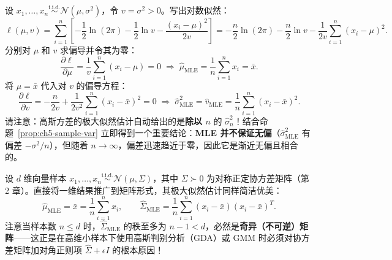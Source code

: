 \begin{example}
\label{ex:ch5-mle-1dgauss}
设 $x_1, \dots, x_n \stackrel{\text{i.i.d.}}{\sim} \mathcal{N}(\mu, \sigma^2)$，令 $v = \sigma^2 > 0$。写出对数似然：
\[
  \ell(\mu, v)
  = \sum_{i=1}^n \left[-\frac{1}{2}\ln(2\pi) - \frac{1}{2}\ln v - \frac{(x_i - \mu)^2}{2v}\right]
  = -\frac{n}{2}\ln(2\pi) - \frac{n}{2}\ln v - \frac{1}{2v}\sum_{i=1}^n (x_i - \mu)^2.
\]
分别对 $\mu$ 和 $v$ 求偏导并令其为零：
\[
  \frac{\partial \ell}{\partial \mu} = \frac{1}{v}\sum_{i=1}^n (x_i - \mu) = 0
  \;\Longrightarrow\;
  \hat{\mu}_{\text{MLE}} = \frac{1}{n}\sum_{i=1}^n x_i = \bar{x}.
\]
将 $\mu = \bar{x}$ 代入对 $v$ 的偏导方程：
\[
  \frac{\partial \ell}{\partial v} = -\frac{n}{2v} + \frac{1}{2v^2}\sum_{i=1}^n (x_i - \bar{x})^2 = 0
  \;\Longrightarrow\;
  \hat{\sigma}^2_{\text{MLE}} = \hat{v}_{\text{MLE}} = \frac{1}{n}\sum_{i=1}^n (x_i - \bar{x})^2.
\]
请注意：高斯方差的极大似然估计自动给出的是\textbf{除以 $n$} 的 $\hat{\sigma}_n^2$！结合命题~\ref{prop:ch5-sample-var} 立即得到一个重要结论：\textbf{MLE 并不保证无偏}（$\hat{\sigma}^2_{\text{MLE}}$ 有偏差 $-\sigma^2/n$），但随着 $n\to\infty$，偏差迅速趋近于零，因此它是渐近无偏且相合的。
\end{example}

\begin{example}
\label{ex:ch5-mle-mvg}
设 $d$ 维向量样本 $x_1, \dots, x_n \stackrel{\text{i.i.d.}}{\sim} \mathcal{N}(\mu, \Sigma)$，其中 $\Sigma \succ 0$ 为对称正定协方差矩阵（第 2 章）。直接将一维结果推广到矩阵形式，其极大似然估计同样简洁优美：
\begin{equation}
  \hat{\mu}_{\text{MLE}} = \bar{x} = \frac{1}{n}\sum_{i=1}^n x_i,
  \qquad
  \widehat{\Sigma}_{\text{MLE}} = \frac{1}{n}\sum_{i=1}^n (x_i - \bar{x})(x_i - \bar{x})^T.
  \label{eq:ch5-mvg-mle}
\end{equation}
注意当样本数 $n \le d$ 时，$\widehat{\Sigma}_{\text{MLE}}$ 的秩至多为 $n-1 < d$，必然是\textbf{奇异（不可逆）矩阵}——这正是在高维小样本下使用高斯判别分析（GDA）或 GMM 时必须对协方差矩阵加对角正则项 $\widehat{\Sigma} + \epsilon I$ 的根本原因！
\end{example}

